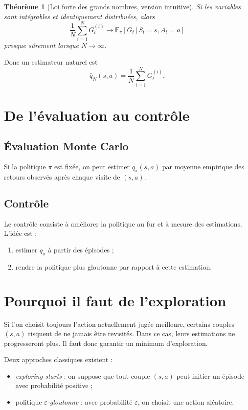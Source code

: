 \documentclass[11pt,a4paper]{article}
\newtheorem*{theoreme}{Théorème}
\newcommand{\E}{\mathbb{E}}
\newcommand{\given}{\,|\,}
\begin{document}
\begin{theoreme}[Loi forte des grands nombres, version intuitive]
Si les variables sont intégrables et identiquement distribuées, alors
\[
\frac1N\sum_{i=1}^N G_t^{(i)} \to \E_{\pi}[G_t\given S_t=s,A_t=a]
\]
presque sûrement lorsque $N\to\infty$.
\end{theoreme}

Donc un estimateur naturel est
\[
\hat q_N(s,a)=\frac1N\sum_{i=1}^N G_t^{(i)}.
\]

\section{De l'évaluation au contrôle}

\subsection{Évaluation Monte Carlo}

Si la politique $\pi$ est fixée, on peut estimer $q_{\pi}(s,a)$ par moyenne empirique des retours observés après chaque visite de $(s,a)$.

\subsection{Contrôle}

Le contrôle consiste à améliorer la politique au fur et à mesure des estimations. L'idée est :
\begin{enumerate}[leftmargin=1.6em]
    \item estimer $q_{\pi}$ à partir des épisodes ;
    \item rendre la politique plus gloutonne par rapport à cette estimation.
\end{enumerate}

\section{Pourquoi il faut de l'exploration}

Si l'on choisit toujours l'action actuellement jugée meilleure, certains couples $(s,a)$ risquent de ne jamais être revisités. Dans ce cas, leurs estimations ne progresseront plus. Il faut donc garantir un minimum d'exploration.

Deux approches classiques existent :
\begin{itemize}[leftmargin=1.6em]
    \item \emph{exploring starts} : on suppose que tout couple $(s,a)$ peut initier un épisode avec probabilité positive ;
    \item politique \emph{$\varepsilon$-gloutonne} : avec probabilité $\varepsilon$, on choisit une action aléatoire.
\end{itemize}
\end{document}
